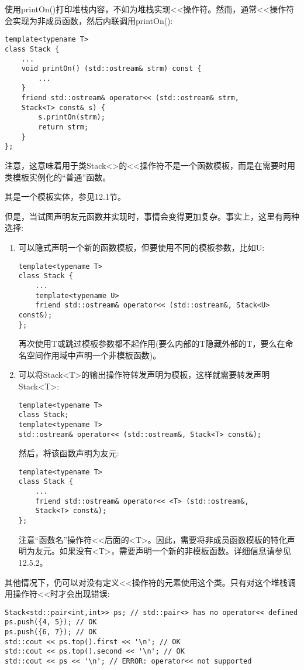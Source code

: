 
使用printOn()打印堆栈内容，不如为堆栈实现<<操作符。然而，通常<<操作符会实现为非成员函数，然后内联调用printOn():

\begin{lstlisting}[style=styleCXX]
template<typename T>
class Stack {
	...
	void printOn() (std::ostream& strm) const {
		...
	}
	friend std::ostream& operator<< (std::ostream& strm,
	Stack<T> const& s) {
		s.printOn(strm);
		return strm;
	}
};
\end{lstlisting}

注意，这意味着用于类Stack<>的<<操作符不是一个函数模板，而是在需要时用类模板实例化的“普通”函数。

\begin{tcolorbox}[colback=webgreen!5!white,colframe=webgreen!75!black]
\hspace*{0.75cm}其是一个模板实体，参见12.1节。
\end{tcolorbox}

但是，当试图声明友元函数并实现时，事情会变得更加复杂。事实上，这里有两种选择:

\begin{enumerate}
\item 
可以隐式声明一个新的函数模板，但要使用不同的模板参数，比如U:

\begin{lstlisting}[style=styleCXX]
template<typename T>
class Stack {
	...
	template<typename U>
	friend std::ostream& operator<< (std::ostream&, Stack<U> const&);
};
\end{lstlisting}

再次使用T或跳过模板参数都不起作用(要么内部的T隐藏外部的T，要么在命名空间作用域中声明一个非模板函数)。

\item 
可以将Stack<T>的输出操作符转发声明为模板，这样就需要转发声明Stack<T>:

\begin{lstlisting}[style=styleCXX]
template<typename T>
class Stack;
template<typename T>
std::ostream& operator<< (std::ostream&, Stack<T> const&);
\end{lstlisting}

然后，将该函数声明为友元:

\begin{lstlisting}[style=styleCXX]
template<typename T>
class Stack {
	...
	friend std::ostream& operator<< <T> (std::ostream&,
	Stack<T> const&);
};
\end{lstlisting}

注意“函数名”操作符<<后面的<T>。因此，需要将非成员函数模板的特化声明为友元。如果没有<T>，需要声明一个新的非模板函数。详细信息请参见12.5.2。
\end{enumerate}

其他情况下，仍可以对没有定义<<操作符的元素使用这个类。只有对这个堆栈调用操作符<<时才会出现错误:

\begin{lstlisting}[style=styleCXX]
Stack<std::pair<int,int>> ps; // std::pair<> has no operator<< defined
ps.push({4, 5}); // OK
ps.push({6, 7}); // OK
std::cout << ps.top().first << '\n'; // OK
std::cout << ps.top().second << '\n'; // OK
std::cout << ps << '\n'; // ERROR: operator<< not supported
\end{lstlisting}




